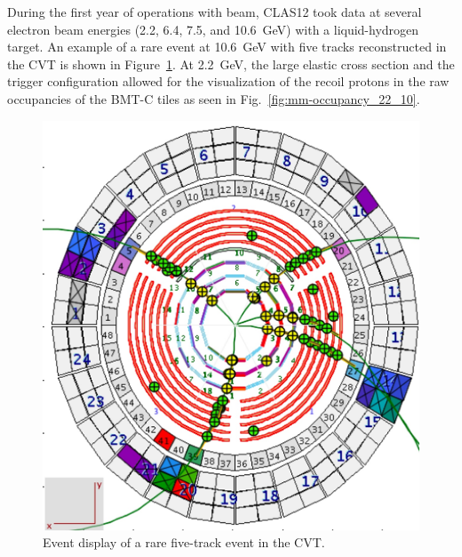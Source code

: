 During the first year of operations with beam, CLAS12 took data at several electron beam energies (2.2, 6.4, 7.5, and 10.6~GeV)
with a liquid-hydrogen target. An example of a rare event at 10.6~GeV with five tracks reconstructed in the CVT is 
shown in Figure~\ref{fig:cd-tracks}. At 2.2~GeV, the large elastic cross section and the trigger configuration allowed 
for the visualization of the recoil protons in the raw occupancies of the BMT-C tiles as seen in 
Fig.~\ref{fig:mm-occupancy_22_10}. 

\begin{figure}[htb]
 \includegraphics[width=.9\columnwidth]{images/cd-tracks}
 \caption{Event display of a rare five-track event in the CVT.}
 \label{fig:cd-tracks}
\end{figure}


